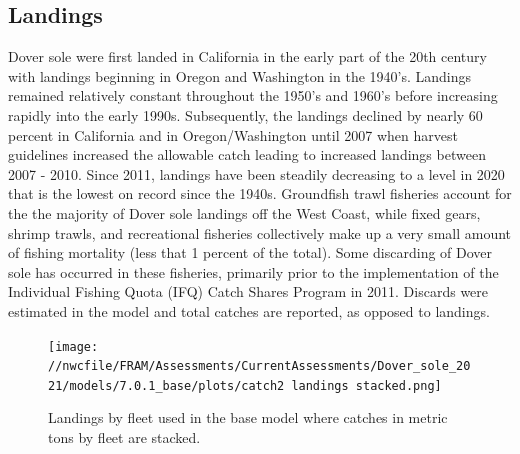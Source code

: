 \documentclass[11pt,
  english,
  a4paper,
]{article}
\begin{document}
\leavevmode\tagmcend\tagstructend\par


\hypertarget{landings}{%
\subsection*{Landings}\label{landings}}

\leavevmode\tagmcend\tagstructend


Dover sole were first landed in California in the early part of the 20th century with landings beginning in Oregon and Washington in the 1940's. Landings remained relatively constant throughout the 1950's and 1960's before increasing rapidly into the early 1990s. Subsequently, the landings declined by nearly 60 percent in California and in Oregon/Washington until 2007 when harvest guidelines increased the allowable catch leading to increased landings between 2007 - 2010. Since 2011, landings have been steadily decreasing to a level in 2020 that is the lowest on record since the 1940s. Groundfish trawl fisheries account for the the majority of Dover sole landings off the West Coast, while fixed gears, shrimp trawls, and recreational fisheries collectively make up a very small amount of fishing mortality (less that 1 percent of the total). Some discarding of Dover sole has occurred in these fisheries, primarily prior to the implementation of the Individual Fishing Quota (IFQ) Catch Shares Program in 2011. Discards were estimated in the model and total catches are reported, as opposed to landings.

\leavevmode\tagmcend\tagstructend\par




\begin{figure}
\centering
\texttt{[image: //nwcfile/FRAM/Assessments/CurrentAssessments/Dover\_sole\_2021/models/7.0.1\_base/plots/catch2 landings stacked.png]}
\caption{Landings by fleet used in the base model where catches in metric tons by fleet are stacked.\label{fig:es-catch}}
\end{figure}
\end{document}
